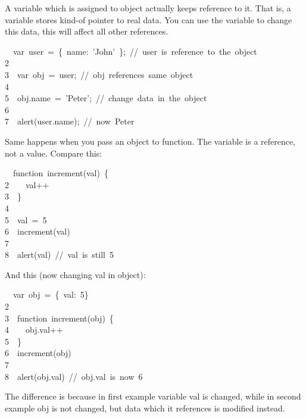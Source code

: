 \documentclass{article}
\begin{document}
\noindent{}A variable which is assigned to object actually keeps reference to it. That is, a variable stores kind-of pointer to real data. You can use the variable to change this data, this will affect all other references.%
\begin{mdpre}%
~~{var}~user~=~\{~name:~{'}{John}{'}~\};~{//~user~is~reference~to~the~object}\\
{2}\\
{3}~~{var}~obj~=~user;~{//~obj~references~same~object}\\
{4}\\
{5}~~obj.name~=~{'}{Peter}{'};~{//~change~data~in~the~object}\\
{6}\\
{7}~~alert(user.name);~{//~now~Peter}%
\end{mdpre}\noindent{}Same happens when you pass an object to function. The variable is a reference, not a value. Compare this: 
\begin{mdpre}%
~~{function}~increment(val)~\{\\
{2}~~~~val++\\
{3}~~\}\\
{4}\\
{5}~~val~=~{5}\\
{6}~~increment(val)\\
{7}\\
{8}~~alert(val)~{//~val~is~still~5}%
\end{mdpre}\noindent{}And this (now changing val in object): 
\begin{mdpre}%
~~{var}~obj~=~\{~val:~{5}\}\\
{2}\\
{3}~~{function}~increment(obj)~\{\\
{4}~~~~obj.val++\\
{5}~~\}\\
{6}~~increment(obj)\\
{7}\\
{8}~~alert(obj.val)~{//~obj.val~is~now~6}%
\end{mdpre}\noindent{}The difference is because in first example variable val is changed, while in second example obj is not changed, but data which it references is modified instead.
\end{document}
